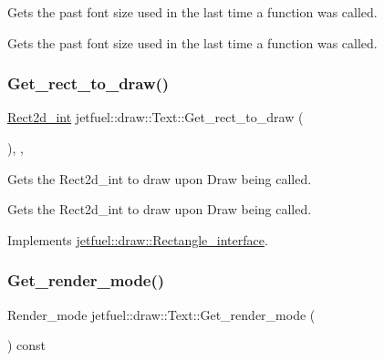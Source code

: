 Gets the past font size used in the last time a function was called. 

Gets the past font size used in the last time a function was called. \mbox{\label{classjetfuel_1_1draw_1_1Text_a362996e996d471729944eebdff1f7636}} 
\subsubsection{\texorpdfstring{Get\+\_\+rect\+\_\+to\+\_\+draw()}{Get\_rect\_to\_draw()}}
{\footnotesize\ttfamily \hyperlink{classjetfuel_1_1draw_1_1Rect2d}{Rect2d\+\_\+int} jetfuel\+::draw\+::\+Text\+::\+Get\+\_\+rect\+\_\+to\+\_\+draw (\begin{DoxyParamCaption}{ }\end{DoxyParamCaption})\hspace{0.3cm}{\ttfamily [inline]}, {\ttfamily [override]}, {\ttfamily [virtual]}}



Gets the Rect2d\+\_\+int to draw upon Draw being called. 

Gets the Rect2d\+\_\+int to draw upon Draw being called. 

Implements \hyperlink{classjetfuel_1_1draw_1_1Rectangle__interface_a03fd3b6842ab7b3065379caec407296f}{jetfuel\+::draw\+::\+Rectangle\+\_\+interface}.

\mbox{\label{classjetfuel_1_1draw_1_1Text_a35a5ad06ffaf6b6b2f18b0c1b02039ef}} 
\subsubsection{\texorpdfstring{Get\+\_\+render\+\_\+mode()}{Get\_render\_mode()}}
{\footnotesize\ttfamily Render\+\_\+mode jetfuel\+::draw\+::\+Text\+::\+Get\+\_\+render\+\_\+mode (\begin{DoxyParamCaption}{ }\end{DoxyParamCaption}) const\hspace{0.3cm}{\ttfamily [inline]}}



